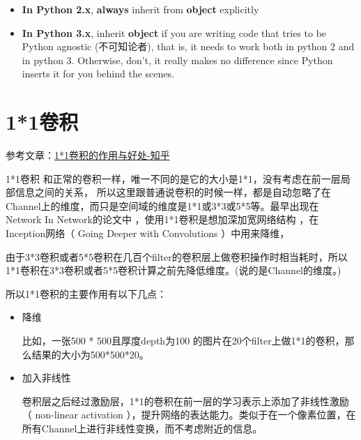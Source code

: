 \begin{itemize}
\item \textbf{In Python 2.x}, \textbf{always} inherit from \textbf{object} explicitly
\item \textbf{In Python 3.x}, inherit \textbf{object} if you are writing code that tries to be Python agnostic (不可知论者), that is, it needs to work both in python 2 and in python 3. Otherwise, don't, it really makes no difference since Python inserts it for you behind the scenes.
\end{itemize}

\section{1*1卷积}

参考文章：\href{https://www.zhihu.com/question/56024942}{1*1卷积的作用与好处-知乎}

1*1卷积 和正常的卷积一样，唯一不同的是它的大小是1*1，没有考虑在前一层局部信息之间的关系， 所以这里跟普通说卷积的时候一样，都是自动忽略了在Channel上的维度，而只是空间域的维度是1*1或3*3或5*5等。最早出现在 Network In Network的论文中 ，使用1*1卷积是想加深加宽网络结构 ，在Inception网络（ Going Deeper with Convolutions ）中用来降维，

由于3*3卷积或者5*5卷积在几百个filter的卷积层上做卷积操作时相当耗时，所以1*1卷积在3*3卷积或者5*5卷积计算之前先降低维度。(说的是Channel的维度。)

所以1*1卷积的主要作用有以下几点：
\begin{itemize}
\item 降维

比如，一张500 * 500且厚度depth为100 的图片在20个filter上做1*1的卷积，那么结果的大小为500*500*20。

\item 加入非线性

卷积层之后经过激励层，1*1的卷积在前一层的学习表示上添加了非线性激励（ non-linear activation ），提升网络的表达能力。类似于在一个像素位置，在所有Channel上进行非线性变换，而不考虑附近的信息。

\end{itemize}

